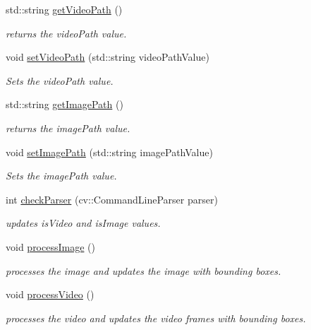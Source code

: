 \begin{DoxyCompactItemize}
std\+::string \hyperlink{classRobot_a294235e89dc45aadcf604a2b028b36bd}{get\+Video\+Path} ()
\begin{DoxyCompactList}\small\item\em returns the video\+Path value. \end{DoxyCompactList}\item 
void \hyperlink{classRobot_ac0d675fbcf6c76307173e95b04b983b0}{set\+Video\+Path} (std\+::string video\+Path\+Value)
\begin{DoxyCompactList}\small\item\em Sets the video\+Path value. \end{DoxyCompactList}\item 
std\+::string \hyperlink{classRobot_a5d07f2808f6ab48c0b66061b7518c64b}{get\+Image\+Path} ()
\begin{DoxyCompactList}\small\item\em returns the image\+Path value. \end{DoxyCompactList}\item 
void \hyperlink{classRobot_a1ce5020b8a988df7a48b5c10aa93bcaf}{set\+Image\+Path} (std\+::string image\+Path\+Value)
\begin{DoxyCompactList}\small\item\em Sets the image\+Path value. \end{DoxyCompactList}\item 
int \hyperlink{classRobot_a76d8a5f933040b1c7835de9ee8e50856}{check\+Parser} (cv\+::\+Command\+Line\+Parser parser)
\begin{DoxyCompactList}\small\item\em updates is\+Video and is\+Image values. \end{DoxyCompactList}\item 
void \hyperlink{classRobot_a069bd7ac190af21faaeebae6a26ac340}{process\+Image} ()
\begin{DoxyCompactList}\small\item\em processes the image and updates the image with bounding boxes. \end{DoxyCompactList}\item 
void \hyperlink{classRobot_ab06570394ae53dae4fe351598081ba68}{process\+Video} ()
\begin{DoxyCompactList}\small\item\em processes the video and updates the video frames with bounding boxes. \end{DoxyCompactList}\end{DoxyCompactItemize}


